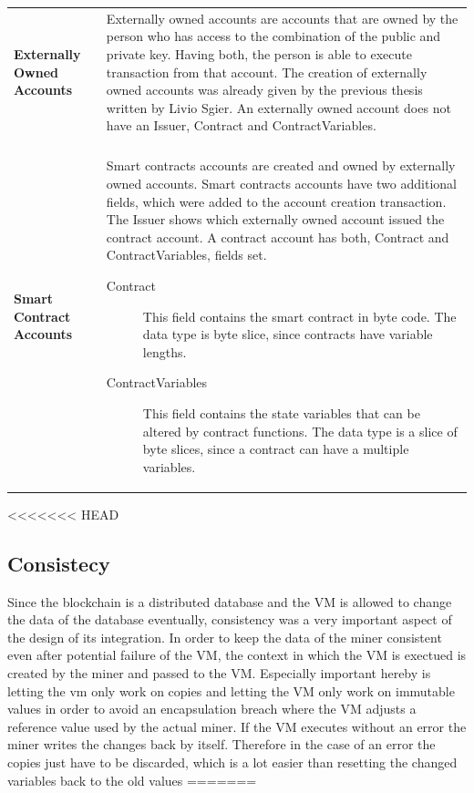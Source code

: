 \begin{tabular}[t]{ p{3cm} p{12.5cm}}
\raggedright
\textbf{Externally Owned Accounts} &
Externally owned accounts are accounts that are owned by the person who has access to the combination of the public and private key. Having both, the person is able to execute transaction from that account. The creation of externally owned accounts was already given by the previous thesis written by Livio Sgier. An externally owned account does not have an Issuer, Contract and ContractVariables. \\ \\
\textbf{Smart Contract Accounts} &
Smart contracts accounts are created and owned by externally owned accounts. Smart contracts accounts have two additional fields, which were added to the account creation transaction. The Issuer shows which externally owned account issued the contract account. A contract account has both, Contract and ContractVariables, fields set.

	\begin{description}
  		\item[Contract] This field contains the smart contract in byte code. The data type is byte slice, since contracts have variable lengths.
  		\item[ContractVariables] This field contains the state variables that can be altered by contract functions. The data type is a slice of byte slices, since a contract can have a multiple variables.
	\end{description}
\end{tabular}

<<<<<<< HEAD
\subsection{Consistecy}
Since the blockchain is a distributed database and the VM is allowed to change the data of the database eventually, consistency was a very important aspect of the design of its integration. In order to keep the data of the miner consistent even after potential failure of the VM, the context in which the VM is exectued is created by the miner and passed to the VM. Especially important hereby is letting the vm only work on copies and letting the VM only work on immutable values in order to avoid an encapsulation breach where the VM adjusts a reference value used by the actual miner. If the VM executes without an error the miner writes the changes back by itself. Therefore in the case of an error the copies just have to be discarded, which is a lot easier than resetting the changed variables back to the old values
=======

